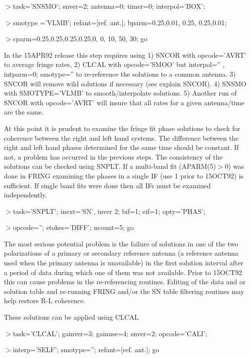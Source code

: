 \begin{enumerate}
\par\noindent
$>$task='SNSMO'; snver=2; antenna=0; timer=0; interpol='BOX';
\par\noindent
$>$smotype ='VLMB'; refant=[ref. ant.]; bparm=0.25,0.01, 0.25, 0.25,0.01;
\par\noindent
$>$cparm=0.25,0.25,0.25,0.25,0, 0, 10, 50, 30; go

   In the 15APR92 release this step requires using 1) SNCOR with
opcode='AVRT' to average fringe rates, 2) CLCAL with opcode='SMOO' but
interpol='' , intparm=0; smotype='' to re-reference the solutions to a
common antenna. 3) SNCOR will remove wild solutions if necessary (see
explain SNCOR). 4) SNSMO with SMOTYPE='VLMB' to smooth/interpolate
solutions.  5) Another run of SNCOR with opcode='AVRT' will insure
that all rates for a given antenna/time are the same.

   At this point it is prudent to examine the fringe fit phase
solutions to check for coherence between the right and left hand
systems.  The difference between the right and left hand phases
determined for the same time should be constant.  If not, a problem
has occurred in the previous steps.  The consistency of the solutions
can be checked using SNPLT.  If
a multi-band fit (APARM(5)$>$0) was done in FRING examining the phases
in a single IF (use 1 prior to 15OCT92) is sufficient.  If single band
fits were done then all IFs must be examined independently.
\par\noindent
$>$task='SNPLT'; inext='SN', inver 2; bif=1; eif=1; opty='PHAS';
\par\noindent
$>$opcode=''; stokes='DIFF'; ncount=5; go

   The most serious potential problem is the failure of solutions in
one of the two polarizations of a primary or secondary reference
antenna (a reference antenna used when the primary antenna is
unavailable) in the first solution interval after a period of data
during which one of them was not available. Prior to 15OCT92 this can
cause problems in the re-referencing routines.  Editing of the data and
or solution table and re-running FRING and/or the SN table filtering
routines may help restore R-L coherence.



  These solutions can be applied using CLCAL
\par\noindent
$>$task='CLCAL'; gainver=3; gainuse=4; snver=2; opcode='CALI';
\par\noindent
$>$interp='SELF'; smotype=''; refant=[ref. ant.]; go


\end{enumerate}
